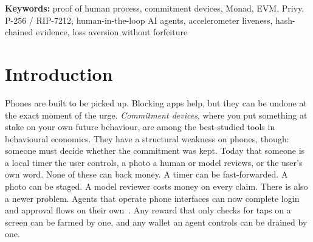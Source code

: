 \documentclass[10pt]{article}
\newcommand{\code}[1]{\texttt{\small #1}}
\newcommand{\mon}{\textsc{mon}}
\begin{document}
\begin{abstract}
\emph{Results.} Measurements from the earlier devnet prototype (9--12 October 2026, a real Android phone and the
emulator): 56 sessions from 20 wallets, 19 settled and 9 rejected. The timing heuristic scored all 22 sessions that had
enough answers at risk $0$, including every session driven by \code{adb input tap}. Timing alone does not detect a
script. The motion floor $\tau=150$\,mm/s$^2$ did: \textbf{29 of 30} injected taps on the real phone read
20--115\,mm/s$^2$ (median 35.5). One read 734\,mm/s$^2$. Every one of the eight injected-tap sessions contains at least one
reading below the floor and would be rejected in production. The emulator's synthetic knocks (2,189--2,190\,mm/s$^2$)
\emph{pass}. This shows that a client able to inject sensor values defeats the motion check, and hardware attestation is
required to close it. On Monad testnet, recording one verified session cost 161,016 gas ($\approx$0.0164\,\mon{} at
102\,gwei; 13 Oct) and, in a later measurement, 128,512 gas (0.0131\,\mon{}, $\approx$\$0.0003 at \$0.0244/\mon{};
14 Oct); blocks averaged 0.304\,s. Real-phone sessions with Google sign-in through Privy, a No-Loss stake, and Knock to
Approve with a physical knock are on-chain. Re-deriving the chain and evaluating the policy takes 16\,\textmu s (median)
for a 4-checkpoint session on a laptop CPU. The system comprises about 2,600 lines of Python, 355 lines of Solidity and
about 5,400 lines of Kotlin, with 59 backend tests, 10 Foundry contract tests (including real P-256 signatures) and 10
Android unit tests passing. Nothing here is on mainnet; all value is testnet \mon{}.
\end{abstract}

\noindent\textbf{Keywords:} proof of human process, commitment devices, Monad, EVM, Privy, P-256 / RIP-7212,
human-in-the-loop AI agents, accelerometer liveness, hash-chained evidence, loss aversion without forfeiture

\section{Introduction}

Phones are built to be picked up. Blocking apps help, but they can be undone at the exact moment of the urge.
\emph{Commitment devices}, where you put something at stake on your own future behaviour, are among the best-studied
tools in behavioural economics. They have a structural weakness on phones, though: someone must decide whether the
commitment was kept. Today that someone is a local timer the user controls, a photo a human or model reviews, or the
user's own word. None of these can back money. A timer can be fast-forwarded. A photo can be staged. A model reviewer
costs money on every claim. There is also a newer problem. Agents that operate phone interfaces can now complete login
and approval flows on their own~\cite{liu2026}. Any reward that only checks for taps on a screen can be farmed by one,
and any wallet an agent controls can be drained by one.
\end{document}
